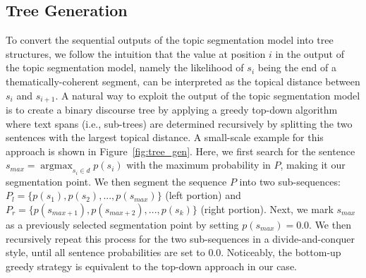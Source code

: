 \documentclass[letterpaper]{article} %
\DeclareMathOperator*{\argmax}{argmax}
\begin{document}
\begin{table}[t]
    \setlength{\belowcaptionskip}{-5pt}
    {\renewcommand{\arraystretch}{1.2}
    \centering
    }
    \caption{Average topic segmentation performance $\pm$ standard deviation over 5 runs, using the $P_k$ error score \cite{Beeferman1999} (lower values indicate better performance) on three evaluation corpora. Best performance per column in \textbf{bold}.}
    \label{tab:ts_ds_performance}
\end{table}

\subsection{Tree Generation}
\label{tree_agg}
To convert the sequential outputs of the topic segmentation model into tree structures, 
we follow the intuition that the value at position $i$ in the output of the topic segmentation model, namely the likelihood of $s_i$ being the end of a thematically-coherent segment, can be interpreted as the topical distance between $s_i$ and $s_{i+1}$.
A natural way to exploit the output of the topic segmentation model is to create a binary discourse tree by applying a greedy top-down algorithm where text spans (i.e., sub-trees) are determined recursively by splitting the two sentences with the largest topical distance. A small-scale example for this approach is shown in Figure~\ref{fig:tree_gen}. Here, we first search for the sentence $s_{max} = \argmax_{s_i \in d}{p(s_i)}$ with the maximum probability in $P$, making it our segmentation point. We then segment the sequence $P$ into two sub-sequences: $P_l = \{p(s_1), p(s_2),  ... , p(s_{max})\}$ (left portion) and $P_r = \{p(s_{max+1}), p(s_{max+2}), ... , p(s_{k})\}$ (right portion). Next, we mark $s_{max}$ as a previously selected segmentation point by setting $p(s_{max}) = 0.0$. We then recursively repeat this process for the two sub-sequences in a divide-and-conquer style, until all sentence probabilities are set to $0.0$. 
Noticeably, the bottom-up greedy strategy is equivalent to the top-down approach in our case.
\end{document}
